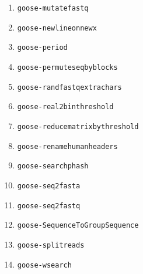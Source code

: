 \begin{enumerate}
\item \texttt{goose-mutatefastq}
\item \texttt{goose-newlineonnewx}
\item \texttt{goose-period}
\item \texttt{goose-permuteseqbyblocks}

\item \texttt{goose-randfastqextrachars}

\item \texttt{goose-real2binthreshold}
\item \texttt{goose-reducematrixbythreshold}
\item \texttt{goose-renamehumanheaders}

\item \texttt{goose-searchphash}

\item \texttt{goose-seq2fasta}
\item \texttt{goose-seq2fastq}
\item \texttt{goose-SequenceToGroupSequence}
\item \texttt{goose-splitreads}

\item \texttt{goose-wsearch}
\end{enumerate}



%
%
%


%
%
%
%
%
%
%
%
%
%
%
%
%
%
%
%
%
%
%
%
%
%
%
%
%
%
%
%
%
%
%